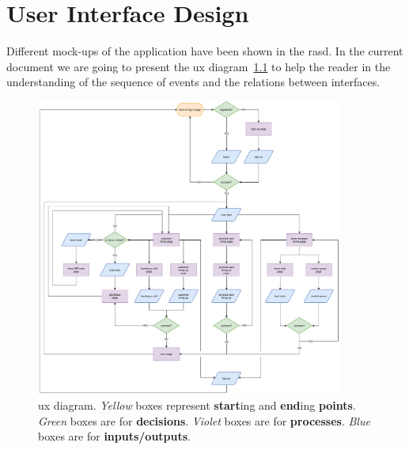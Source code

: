 \chapter{User Interface Design}

Different mock-ups of the application have been shown in the \gls{rasd}.
In the current document we are going to present the \gls{ux} diagram~\ref{fig:UXDiagram} to help the reader in the understanding of the sequence of events and the relations between interfaces.

\begin{figure}[H]
    \centering
    \includegraphics[width=0.9\textwidth]{images/UX.pdf}
    \caption{\gls{ux} diagram. \textit{Yellow} boxes represent \textbf{start}ing and \textbf{end}ing \textbf{points}. \textit{Green} boxes are for \textbf{decisions}. \textit{Violet} boxes are for \textbf{processes}. \textit{Blue} boxes are for \textbf{inputs/outputs}.}\label{fig:UXDiagram}
\end{figure}

